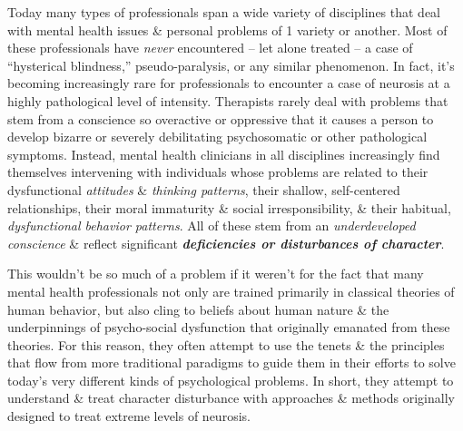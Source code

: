 \documentclass{article}
\numberwithin{equation}{section}
\begin{document}
Today many types of professionals span a wide variety of disciplines that deal with mental health issues \& personal problems of 1 variety or another. Most of these professionals have \textit{never} encountered -- let alone treated -- a case of ``hysterical blindness,'' pseudo-paralysis, or any similar phenomenon. In fact, it's becoming increasingly rare for professionals to encounter a case of neurosis at a highly pathological level of intensity. Therapists rarely deal with problems that stem from a conscience so overactive or oppressive that it causes a person to develop bizarre or severely debilitating psychosomatic or other pathological symptoms. Instead, mental health clinicians in all disciplines increasingly find themselves intervening with individuals whose problems are related to their dysfunctional \textit{attitudes} \& \textit{thinking patterns}, their shallow, self-centered relationships, their moral immaturity \& social irresponsibility, \& their habitual, \textit{dysfunctional behavior patterns}. All of these stem from an \textit{underdeveloped conscience} \& reflect significant \textbf{\textit{deficiencies or disturbances of character}}.

This wouldn't be so much of a problem if it weren't for the fact that many mental health professionals not only are trained primarily in classical theories of human behavior, but also cling to beliefs about human nature \& the underpinnings of psycho-social dysfunction that originally emanated from these theories. For this reason, they often attempt to use the tenets \& the principles that flow from more traditional paradigms to guide them in their efforts to solve today's very different kinds of psychological problems. In short, they attempt to understand \& treat character disturbance with approaches \& methods originally designed to treat extreme levels of neurosis.
\end{document}
